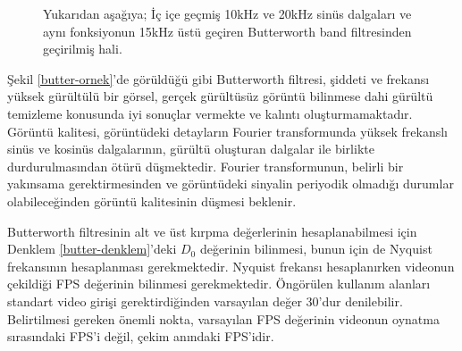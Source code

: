 \documentclass[a4paper, 12pt]{article}
\begin{document}
\begin{wrapfigure}{r}{0.5\textwidth}
	\vspace{-0.5cm}
	\caption{Yukarıdan aşağıya; İç içe geçmiş 10kHz ve 20kHz sinüs dalgaları ve aynı fonksiyonun 15kHz üstü geçiren Butterworth band filtresinden geçirilmiş hali. }
	\vspace{-0.3cm}
	\label{sekil:butter-graf}
\end{wrapfigure}



Şekil \ref{butter-ornek}'de görüldüğü gibi Butterworth filtresi, şiddeti ve frekansı yüksek gürültülü bir görsel, gerçek gürültüsüz görüntü bilinmese dahi gürültü temizleme konusunda iyi sonuçlar vermekte ve kalıntı oluşturmamaktadır. Görüntü kalitesi, görüntüdeki detayların Fourier transformunda yüksek frekanslı sinüs ve kosinüs dalgalarının, gürültü oluşturan dalgalar ile birlikte durdurulmasından ötürü düşmektedir. Fourier transformunun, belirli bir yakınsama gerektirmesinden ve görüntüdeki sinyalin periyodik olmadığı durumlar olabileceğinden görüntü kalitesinin düşmesi beklenir. 


Butterworth filtresinin alt ve üst kırpma değerlerinin hesaplanabilmesi için Denklem  \ref{butter-denklem}'deki $D_0$ değerinin bilinmesi, bunun için de Nyquist frekansının hesaplanması gerekmektedir. Nyquist frekansı hesaplanırken videonun çekildiği FPS değerinin bilinmesi gerekmektedir. Öngörülen kullanım alanları standart video girişi gerektirdiğinden varsayılan değer 30'dur denilebilir. Belirtilmesi gereken önemli nokta, varsayılan FPS değerinin videonun oynatma sırasındaki FPS'i değil, çekim anındaki FPS'idir.
\end{document}

